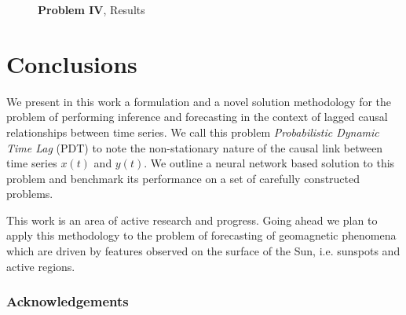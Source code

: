 \documentclass[envcountsect,runningheads]{llncs}
\theoremstyle{etoile}
\begin{document}
\begin{figure}
  \caption{\textbf{Problem IV}, Results}
\end{figure}

\section{Conclusions}

We present in this work a formulation and a novel solution methodology for the problem of performing 
inference and forecasting in the context of lagged causal relationships between time series. 
We call this problem \emph{Probabilistic Dynamic Time Lag} (PDT) to note the non-stationary nature of the 
causal link between time series $x(t)$ and $y(t)$. We outline a neural network based solution to this 
problem and benchmark its performance on a set of carefully constructed problems.

This work is an area of active research and progress. Going ahead we plan to apply this methodology 
to the problem of forecasting of geomagnetic phenomena which are driven by features observed on the 
surface of the Sun, i.e. sunspots and active regions.


\subsubsection*{Acknowledgements}

\clearpage

\end{document}
